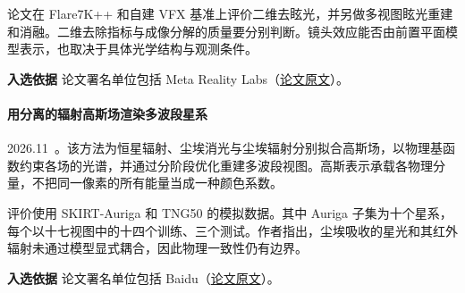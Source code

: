 论文在 Flare7K++ 和自建 VFX 基准上评价二维去眩光，并另做多视图眩光重建和消融。二维去除指标与成像分解的质量要分别判断。镜头效应能否由前置平面模型表示，也取决于具体光学结构与观测条件。

\textbf{入选依据} 论文署名单位包括 Meta Reality Labs（\href{https://arxiv.org/abs/2609.39527}{论文原文}）。

\paragraph{用分离的辐射高斯场渲染多波段星系}
2026.11~\cite{2611_24723}。该方法为恒星辐射、尘埃消光与尘埃辐射分别拟合高斯场，以物理基函数约束各场的光谱，并通过分阶段优化重建多波段视图。高斯表示承载各物理分量，不把同一像素的所有能量当成一种颜色系数。

评价使用 SKIRT-Auriga 和 TNG50 的模拟数据。其中 Auriga 子集为十个星系，每个以十七视图中的十四个训练、三个测试。作者指出，尘埃吸收的星光和其红外辐射未通过模型显式耦合，因此物理一致性仍有边界。

\textbf{入选依据} 论文署名单位包括 Baidu（\href{https://arxiv.org/abs/2611.24723}{论文原文}）。
